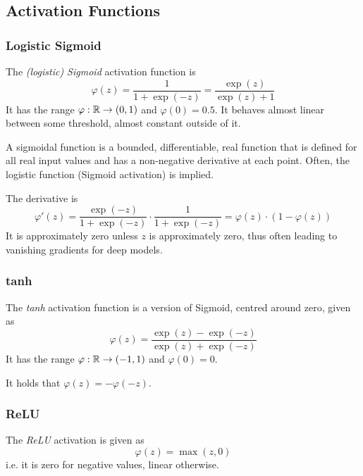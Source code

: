 \subsection{Activation Functions}
\subsubsection{Logistic Sigmoid}
The \emph{(logistic) Sigmoid} activation function is
\begin{equation*}
    \varphi(z) = \frac{1}{1 + \exp{(-z)}}
    = \frac{\exp{(z)}}{\exp{(z)} + 1}
\end{equation*}
It has the range $\varphi : \mathbb{R} \to (0, 1)$
and $\varphi(0) = 0.5$.
It behaves almost linear between some threshold,
almost constant outside of it.

A sigmoidal function is a bounded, differentiable, real function
that is defined for all real input values and has a non-negative
derivative at each point.
Often, the logistic function (Sigmoid activation) is implied.

The derivative is
\begin{equation*}
    \varphi'(z)
    = \frac{\exp{(-z)}}{1 + \exp{(-z)}} \cdot \frac{1}{1 + \exp{(-z)}}
    = \varphi(z) \cdot (1 - \varphi(z))
\end{equation*}
It is approximately zero unless $z$ is approximately zero,
thus often leading to vanishing gradients for deep models.

\subsubsection{tanh}
The \emph{tanh} activation function is a version of Sigmoid, 
centred around zero, given as
\begin{equation*}
    \varphi(z)
    = \frac{\exp{(z)} - \exp{(-z)}}{\exp{(z)} + \exp{(-z)}}
\end{equation*}
It has the range $\varphi : \mathbb{R} \to (-1, 1)$
and $\varphi(0) = 0$.

It holds that $\varphi(z) = - \varphi(-z)$.

\subsubsection{ReLU}
The \emph{ReLU} activation is given as
\begin{equation*}
    \varphi(z) = \max(z, 0)
\end{equation*}
i.e. it is zero for negative values, linear otherwise.


